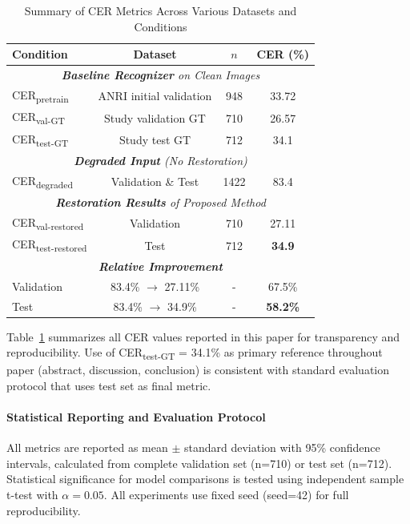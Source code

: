 \documentclass[journal]{IEEEtran}
\begin{document}
\begin{table}[!t]
\centering
\caption{Summary of CER Metrics Across Various Datasets and Conditions}
\label{table:cer_summary}
\small
\begin{tabular}{|l|c|c|c|}
\hline
\textbf{Condition} & \textbf{Dataset} & \textbf{$n$} & \textbf{CER (\%)} \\
\hline
\multicolumn{4}{|c|}{\textit{\textbf{Baseline Recognizer} on Clean Images}} \\
\hline
CER\textsubscript{pretrain} & ANRI initial validation & 948 & 33.72 \\
CER\textsubscript{val-GT} & Study validation GT & 710 & 26.57 \\
CER\textsubscript{test-GT} & Study test GT & 712 & 34.1 \\
\hline
\multicolumn{4}{|c|}{\textit{\textbf{Degraded Input} (No Restoration)}} \\
\hline
CER\textsubscript{degraded} & Validation \& Test & 1422 & 83.4 \\
\hline
\multicolumn{4}{|c|}{\textit{\textbf{Restoration Results} of Proposed Method}} \\
\hline
CER\textsubscript{val-restored} & Validation & 710 & 27.11 \\
CER\textsubscript{test-restored} & Test & 712 & \textbf{34.9} \\
\hline
\multicolumn{4}{|c|}{\textit{\textbf{Relative Improvement}}} \\
\hline
Validation & 83.4\% $\rightarrow$ 27.11\% & - & 67.5\% \\
Test & 83.4\% $\rightarrow$ 34.9\% & - & \textbf{58.2\%} \\
\hline
\end{tabular}
\end{table}

Table~\ref{table:cer_summary} summarizes all CER values reported in this paper for transparency and reproducibility. Use of CER\textsubscript{test-GT} = 34.1\% as primary reference throughout paper (abstract, discussion, conclusion) is consistent with standard evaluation protocol that uses test set as final metric.

\paragraph{Statistical Reporting and Evaluation Protocol}

All metrics are reported as mean $\pm$ standard deviation with 95\% confidence intervals, calculated from complete validation set (n=710) or test set (n=712). Statistical significance for model comparisons is tested using independent sample t-test with $\alpha = 0.05$. All experiments use fixed seed (seed=42) for full reproducibility.
\end{document}

